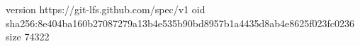 version https://git-lfs.github.com/spec/v1
oid sha256:8e404ba160b27087279a13b4e535b90bd8957b1a4435d8ab4e8625f023fc0236
size 74322
